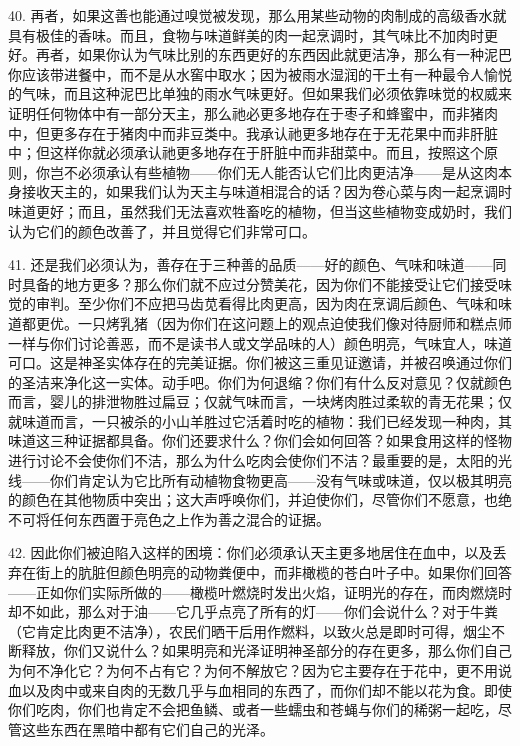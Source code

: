 40. 再者，如果这善也能通过嗅觉被发现，那么用某些动物的肉制成的高级香水就具有极佳的香味。而且，食物与味道鲜美的肉一起烹调时，其气味比不加肉时更好。再者，如果你认为气味比别的东西更好的东西因此就更洁净，那么有一种泥巴你应该带进餐中，而不是从水窖中取水；因为被雨水湿润的干土有一种最令人愉悦的气味，而且这种泥巴比单独的雨水气味更好。但如果我们必须依靠味觉的权威来证明任何物体中有一部分天主，那么祂必更多地存在于枣子和蜂蜜中，而非猪肉中，但更多存在于猪肉中而非豆类中。我承认祂更多地存在于无花果中而非肝脏中；但这样你就必须承认祂更多地存在于肝脏中而非甜菜中。而且，按照这个原则，你岂不必须承认有些植物——你们无人能否认它们比肉更洁净——是从这肉本身接收天主的，如果我们认为天主与味道相混合的话？因为卷心菜与肉一起烹调时味道更好；而且，虽然我们无法喜欢牲畜吃的植物，但当这些植物变成奶时，我们认为它们的颜色改善了，并且觉得它们非常可口。\par

41. 还是我们必须认为，善存在于三种善的品质——好的颜色、气味和味道——同时具备的地方更多？那么你们就不应过分赞美花，因为你们不能接受让它们接受味觉的审判。至少你们不应把马齿苋看得比肉更高，因为肉在烹调后颜色、气味和味道都更优。一只烤乳猪（因为你们在这问题上的观点迫使我们像对待厨师和糕点师一样与你们讨论善恶，而不是读书人或文学品味的人）颜色明亮，气味宜人，味道可口。这是神圣实体存在的完美证据。你们被这三重见证邀请，并被召唤通过你们的圣洁来净化这一实体。动手吧。你们为何退缩？你们有什么反对意见？仅就颜色而言，婴儿的排泄物胜过扁豆；仅就气味而言，一块烤肉胜过柔软的青无花果；仅就味道而言，一只被杀的小山羊胜过它活着时吃的植物：我们已经发现一种肉，其味道这三种证据都具备。你们还要求什么？你们会如何回答？如果食用这样的怪物进行讨论不会使你们不洁，那么为什么吃肉会使你们不洁？最重要的是，太阳的光线——你们肯定认为它比所有动植物食物更高——没有气味或味道，仅以极其明亮的颜色在其他物质中突出；这大声呼唤你们，并迫使你们，尽管你们不愿意，也绝不可将任何东西置于亮色之上作为善之混合的证据。\par

42. 因此你们被迫陷入这样的困境：你们必须承认天主更多地居住在血中，以及丢弃在街上的肮脏但颜色明亮的动物粪便中，而非橄榄的苍白叶子中。如果你们回答——正如你们实际所做的——橄榄叶燃烧时发出火焰，证明光的存在，而肉燃烧时却不如此，那么对于油——它几乎点亮了所有的灯——你们会说什么？对于牛粪（它肯定比肉更不洁净），农民们晒干后用作燃料，以致火总是即时可得，烟尘不断释放，你们又说什么？如果明亮和光泽证明神圣部分的存在更多，那么你们自己为何不净化它？为何不占有它？为何不解放它？因为它主要存在于花中，更不用说血以及肉中或来自肉的无数几乎与血相同的东西了，而你们却不能以花为食。即使你们吃肉，你们也肯定不会把鱼鳞、或者一些蠕虫和苍蝇与你们的稀粥一起吃，尽管这些东西在黑暗中都有它们自己的光泽。\par

